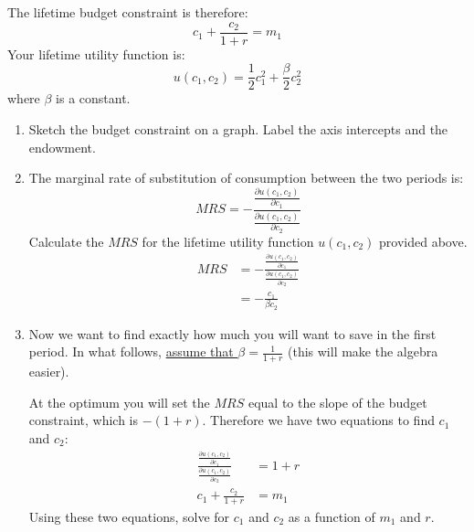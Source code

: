 \documentclass[12pt]{article}
\newcounter{question}[section]
\newenvironment{subquestions}{
  \begin{enumerate}[label=(\roman*)]}{\end{enumerate}}
\begin{document}
The lifetime budget constraint is therefore:
\[
  c_1 + \frac{c_2}{1+r} = m_1
\]
Your lifetime utility function is:
\[
  u\left( c_1,c_2 \right)=\frac{1}{2}c_1^2 + \frac{\beta}{2}c_2^2
\]
where $\beta$ is a constant.
\begin{subquestions}
  \item Sketch the budget constraint on a graph. Label the axis intercepts and
    the endowment.
    \textcolor{solution-color}{
    }
  \item The marginal rate of substitution of consumption between the two
    periods is:
    \[
      MRS = - \frac{\frac{\partial u\left( c_1,c_2 \right)}{\partial c_1}}
                   {\frac{\partial u\left( c_1,c_2 \right)}{\partial c_2}}
    \]
    Calculate the $MRS$ for the lifetime utility function $u\left( c_1,c_2
    \right)$ provided above.
    \textcolor{solution-color}{
      \begin{align*}
      MRS &= - \frac{\frac{\partial u\left( c_1,c_2 \right)}{\partial c_1}}
                   {\frac{\partial u\left( c_1,c_2 \right)}{\partial c_2}}\\
                   &= - \frac{c_1}{\beta c_2}
      \end{align*}
    }
  \item Now we want to find exactly how much you will want to save in the first
    period. In what follows, \underline{assume that $\beta = \frac{1}{1+r}$}
    (this will make the algebra easier).

    At the optimum you will set the $MRS$ equal to the slope of the budget
    constraint, which is $-\left( 1+r \right)$.
    Therefore we have two equations to find $c_1$ and $c_2$:
    \begin{align}
      \frac{\frac{\partial u\left( c_1,c_2 \right)}{\partial c_1}}
           {\frac{\partial u\left( c_1,c_2 \right)}{\partial c_2}} &=
           1+r  \\
             c_1 + \frac{c_2}{1+r} &= m_1
    \end{align}
    Using these two equations, solve for $c_1$ and $c_2$ as a function of $m_1$
    and $r$.


\end{subquestions}
\end{document}
